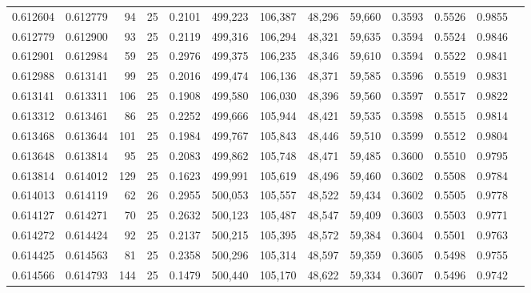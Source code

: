 \begin{tabular}{rrrrrrrrrrrrr}
0.612604 & 0.612779 &    94 &  25 &                                     0.2101 & 499,223 & 106,387 &  48,296 &  59,660 & 0.3593 & 0.5526 & 0.9855 \\
0.612779 & 0.612900 &    93 &  25 &                                     0.2119 & 499,316 & 106,294 &  48,321 &  59,635 & 0.3594 & 0.5524 & 0.9846 \\
0.612901 & 0.612984 &    59 &  25 &                                     0.2976 & 499,375 & 106,235 &  48,346 &  59,610 & 0.3594 & 0.5522 & 0.9841 \\
0.612988 & 0.613141 &    99 &  25 &                                     0.2016 & 499,474 & 106,136 &  48,371 &  59,585 & 0.3596 & 0.5519 & 0.9831 \\
0.613141 & 0.613311 &   106 &  25 &                                     0.1908 & 499,580 & 106,030 &  48,396 &  59,560 & 0.3597 & 0.5517 & 0.9822 \\
0.613312 & 0.613461 &    86 &  25 &                                     0.2252 & 499,666 & 105,944 &  48,421 &  59,535 & 0.3598 & 0.5515 & 0.9814 \\
0.613468 & 0.613644 &   101 &  25 &                                     0.1984 & 499,767 & 105,843 &  48,446 &  59,510 & 0.3599 & 0.5512 & 0.9804 \\
0.613648 & 0.613814 &    95 &  25 &                                     0.2083 & 499,862 & 105,748 &  48,471 &  59,485 & 0.3600 & 0.5510 & 0.9795 \\
0.613814 & 0.614012 &   129 &  25 &                                     0.1623 & 499,991 & 105,619 &  48,496 &  59,460 & 0.3602 & 0.5508 & 0.9784 \\
0.614013 & 0.614119 &    62 &  26 &                                     0.2955 & 500,053 & 105,557 &  48,522 &  59,434 & 0.3602 & 0.5505 & 0.9778 \\
0.614127 & 0.614271 &    70 &  25 &                                     0.2632 & 500,123 & 105,487 &  48,547 &  59,409 & 0.3603 & 0.5503 & 0.9771 \\
0.614272 & 0.614424 &    92 &  25 &                                     0.2137 & 500,215 & 105,395 &  48,572 &  59,384 & 0.3604 & 0.5501 & 0.9763 \\
0.614425 & 0.614563 &    81 &  25 &                                     0.2358 & 500,296 & 105,314 &  48,597 &  59,359 & 0.3605 & 0.5498 & 0.9755 \\
0.614566 & 0.614793 &   144 &  25 &                                     0.1479 & 500,440 & 105,170 &  48,622 &  59,334 & 0.3607 & 0.5496 & 0.9742 \\

\end{tabular}
